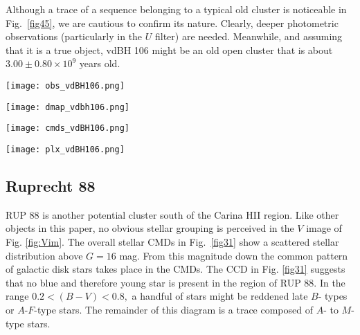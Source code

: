 \documentclass[draft]{aa}
\begin{document}
Although a trace of a sequence belonging to a typical old cluster is
noticeable in Fig.~\ref{fig45}, we are cautious to confirm its nature.
Clearly, deeper photometric observations (particularly in the $U$ filter) are
needed. Meanwhile, and assuming that it is a true object,
vdBH 106 might be an old open cluster that is about $3.00\pm0.80\times10^9$ years
old.

\begin{figure*}[ht]
    \centering
    \texttt{[image: obs\_vdBH106.png]}
    \caption{Idem Fig. \ref{fig:photom_vdBH85} for vdBH 106.}
    \label{fig43}
\end{figure*}
\begin{figure*}[ht]
    \centering
    \texttt{[image: dmap\_vdbh106.png]}
    \caption{Idem Fig. \ref{fig:struct_vdBH85} for vdBH 106.}
    \label{fig44}
\end{figure*}
\begin{figure*}[ht]
    \centering
    \texttt{[image: cmds\_vdBH106.png]}
    \caption{Idem Fig. \ref{fig:fundpars_vdBH85} for vdBH 106.}
    \label{fig45}
\end{figure*}
\begin{figure*}[ht]
    \centering
    \texttt{[image: plx\_vdBH106.png]}
    \caption{Idem Fig. \ref{fig:plx_bys_vdBH85} for vdBH 106.}
    \label{fig46}
\end{figure*}



\subsection{Ruprecht 88}

RUP 88 is another potential cluster south of the Carina HII region. Like
other objects in this paper, no obvious stellar grouping is perceived in the $V$
image of Fig. \ref{fig:Vim}. The overall stellar CMDs in Fig.~\ref{fig31} show a
scattered stellar distribution above $G=16$ mag. From this magnitude down the
common pattern of galactic disk stars takes place in the CMDs. The CCD in Fig.
\ref{fig31} suggests that no blue and therefore young star is present in the
region of RUP 88. In the range $0.2<(B-V)<0.8,$  a handful of stars might be reddened late $B$- types or $A$-$F$-type stars. The remainder of
this diagram is a trace composed of $A$- to $M$-type stars.\\
\end{document}
